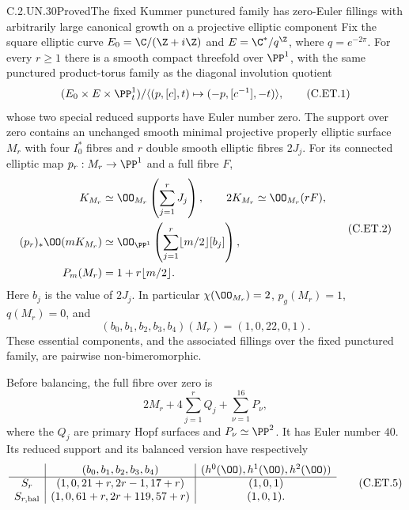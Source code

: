 \begin{statement}{C.2.UN.30}{Proved}{The fixed Kummer punctured family has zero-Euler fillings with arbitrarily large canonical growth on a projective elliptic component}
Fix the square elliptic curve
$E_0=\C/(\Z+i\Z)$ and $E=\C^*/q^{\Z}$,
where $q=e^{-2\pi}$. For every $r\ge1$ there is
a smooth compact threefold over $\PP^1$,
with the same punctured product-torus family
as the diagonal involution quotient
\[
 (E_0\times E\times\PP^1_t)/
      \langle(p,[c],t)\mapsto(-p,[c^{-1}],-t)\rangle,
                                                               \tag{C.ET.1}
\]
whose two special reduced supports have Euler
number zero. The support over zero contains an
unchanged smooth minimal projective properly
elliptic surface $M_r$ with four $I_0^*$ fibres
and $r$ double smooth elliptic fibres $2J_j$.
For its connected elliptic map $p_r:M_r\to\PP^1$
and a full fibre $F$,
\[
 \begin{aligned}
 K_{M_r}&\simeq\OO_{M_r}\left(\sum_{j=1}^rJ_j\right),
 \qquad 2K_{M_r}\simeq\OO_{M_r}(rF),\\
 (p_r)_*\OO(mK_{M_r})
   &\simeq\OO_{\PP^1}\left(
                \sum_{j=1}^r\lfloor m/2\rfloor[b_j]\right),
 \\
 P_m(M_r)&=1+r\lfloor m/2\rfloor .
 \end{aligned}                                             \tag{C.ET.2}
\]
Here $b_j$ is the value of $2J_j$. In particular
$\chi(\OO_{M_r})=2$, $p_g(M_r)=1$, $q(M_r)=0$,
and
\[
            (b_0,b_1,b_2,b_3,b_4)(M_r)
                         =(1,0,22,0,1).              \tag{C.ET.3}
\]
These essential components, and the associated
fillings over the fixed punctured family, are
pairwise non-bimeromorphic.

Before balancing, the full fibre over zero is
\[
                  2M_r+4\sum_{j=1}^rQ_j
                           +\sum_{\nu=1}^{16}P_\nu,
                                                               \tag{C.ET.4}
\]
where the $Q_j$ are primary Hopf surfaces and
$P_\nu\simeq\PP^2$. It has Euler number $40$.
Its reduced support and its balanced version
have respectively
\[
 \begin{array}{c|c|c}
 &(b_0,b_1,b_2,b_3,b_4)&
                 (h^0(\OO),h^1(\OO),h^2(\OO))\\ \hline
 S_r&(1,0,21+r,2r-1,17+r)&(1,0,1)\\
 S_{r,\mathrm{bal}}&(1,0,61+r,2r+119,57+r)&(1,0,1).
 \end{array}                                             \tag{C.ET.5}
\]
\end{statement}
